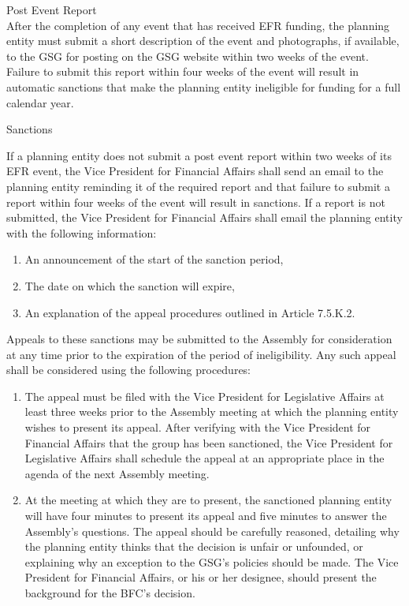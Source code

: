 \begin{bylaws-number}
  \item Post Event Report \hfill \\
After the completion of any event that has received EFR funding, the planning entity must submit a short description of the event and photographs, if available, to the GSG for posting on the GSG website within two weeks of the event. Failure to submit this report within four weeks of the event will result in automatic sanctions that make the planning entity ineligible for funding for a full calendar year.
  \item Sanctions
\begin{bylaws-number}
  \item If a planning entity does not submit a post event report within two weeks of its EFR event, the Vice President for Financial Affairs shall send an email to the planning entity reminding it of the required report and that failure to submit a report within four weeks of the event will result in sanctions. If a report is not submitted, the Vice President for Financial Affairs shall email the planning entity with the following information:
  \begin{enumerate}[i]
    \item An announcement of the start of the sanction period,
    \item The date on which the sanction will expire,
    \item An explanation of the appeal procedures outlined in Article 7.5.K.2.
  \end{enumerate}
    \item Appeals to these sanctions may be submitted to the Assembly for consideration at any time prior to the expiration of the period of ineligibility. Any such appeal shall be considered using the following procedures:
    \begin{enumerate}[i]
      \item The appeal must be filed with the Vice President for Legislative Affairs at least three weeks prior to the Assembly meeting at which the planning entity wishes to present its appeal. After verifying with the Vice President for Financial Affairs that the group has been sanctioned, the Vice President for Legislative Affairs shall schedule the appeal at an appropriate place in the agenda of the next Assembly meeting.
      \item At the meeting at which they are to present, the sanctioned planning entity will have four minutes to present its appeal and five minutes to answer the Assembly’s questions. The appeal should be carefully reasoned, detailing why the planning entity thinks that the decision is unfair or unfounded, or explaining why an exception to the GSG’s policies should be made. The Vice President for Financial Affairs, or his or her designee, should present the background for the BFC’s decision.

\end{enumerate}
\end{bylaws-number}
\end{bylaws-number}
